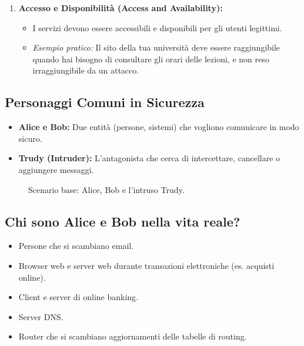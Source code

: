 \documentclass{article}
\begin{document}
\begin{enumerate}[label=\arabic*.]
    \item \textbf{Accesso e Disponibilità (Access and Availability):}
    \begin{itemize}
        \item I servizi devono essere accessibili e disponibili per gli utenti legittimi.
        \item \textit{Esempio pratico:} Il sito della tua università deve essere raggiungibile quando hai bisogno di consultare gli orari delle lezioni, e non reso irraggiungibile da un attacco.
    \end{itemize}
\end{enumerate}

\subsection{Personaggi Comuni in Sicurezza}
\begin{itemize}
    \item \textbf{Alice e Bob:} Due entità (persone, sistemi) che vogliono comunicare in modo sicuro.
    \item \textbf{Trudy (Intruder):} L'antagonista che cerca di intercettare, cancellare o aggiungere messaggi.
\end{itemize}

\begin{figure}[H]
    \centering
    \caption{Scenario base: Alice, Bob e l'intruso Trudy.}
\end{figure}

\subsection{Chi sono Alice e Bob nella vita reale?}
\begin{itemize}
    \item Persone che si scambiano email.
    \item Browser web e server web durante transazioni elettroniche (es. acquisti online).
    \item Client e server di online banking.
    \item Server DNS.
    \item Router che si scambiano aggiornamenti delle tabelle di routing.
\end{itemize}
\end{document}
